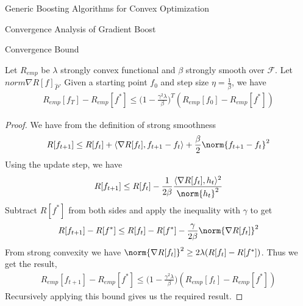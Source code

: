 \documentclass{article}
\begin{document}
\begin{psection}{Generic Boosting Algorithms for Convex Optimization}
\begin{psubsection}{Convergence Analysis of Gradient Boost}
\begin{pssubsection}{Convergence Bound}
			\begin{theorem}
				Let $R_{emp}$ be $\lambda$ strongly convex functional and $\beta$ strongly smooth over $\mathcal{F}$. Let $norm{\nabla R[f]}_{\hat{P}}$. Given a starting point $f_0$ and step size $\eta=\frac{1}{\beta}$, we have
				\begin{align*}
					R_{emp}[f_T]-R_{emp}[f^*]\leq\Big(1-\frac{\gamma^2\lambda}{\beta}\Big)^T(R_{emp}[f_0]-R_{emp}[f^*])
				\end{align*}
			\end{theorem}

			\begin{proof}
				We have from the definition of strong smoothness
				\begin{align*}
					R[f_{t+1}]\leq R[f_t]+\langle\nabla R[f_t], f_{t+1}-f_t\rangle+\frac{\beta}{2}\norm{f_{t+1}-f_t}^2
				\end{align*}
				Using the update step, we have
				\begin{align*}
					R[f_{t+1}]\leq R[f_t]-\frac{1}{2\beta}\frac{\langle\nabla R[f_t],h_t\rangle^2}{\norm{h_t}^2}
				\end{align*}
				Subtract $R[f^*]$ from both sides and apply the inequality with $\gamma$ to get
				\begin{align*}
					R[f_{t+1}]-R[f^*]\leq R[f_t]-R[f^*]-\frac{\gamma}{2\beta}\norm{\nabla R[f_t]}^2
				\end{align*}
				From strong convexity we have $\norm{\nabla R[f_t]}^2\geq 2\lambda(R[f_{t}]-R[f^*])$. Thus we get the result,
				\begin{align*}
					R_{emp}[f_{t+1}]-R_{emp}[f^*]\leq\Big(1-\frac{\gamma^2\lambda}{\beta}\Big)(R_{emp}[f_t]-R_{emp}[f^*])
				\end{align*}
				Recursively applying this bound gives us the required result.
				\qedhere
			\end{proof}


\end{pssubsection}
\end{psubsection}
\end{psection}
\end{document}
